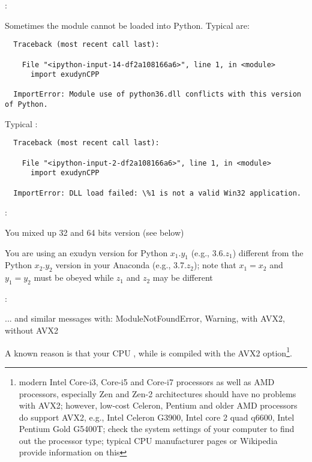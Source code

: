 \noindent {}:
\bi
  \item Sometimes the \codeName module cannot be loaded into Python. Typical  are: \vspace{1pt}\\
\plainlststyle
\begin{lstlisting}
  Traceback (most recent call last):

    File "<ipython-input-14-df2a108166a6>", line 1, in <module>
      import exudynCPP

  ImportError: Module use of python36.dll conflicts with this version of Python.
\end{lstlisting}
%
Typical :\vspace{1pt}\\
\begin{lstlisting}
  Traceback (most recent call last):
  
    File "<ipython-input-2-df2a108166a6>", line 1, in <module>
      import exudynCPP

  ImportError: DLL load failed: \%1 is not a valid Win32 application.
\end{lstlisting}
%
:
\bi
\item[$\ra$] You mixed up 32 and 64 bits version (see below) 
\item[$\ra$] You are using an exudyn version for Python $x_1.y_1$ (e.g., 3.6.$z_1$) different from the Python $x_2.y_2$ version in your Anaconda (e.g., 3.7.$z_2$); note that $x_1=x_2$ and $y_1=y_2$ must be obeyed while $z_1$ and $z_2$ may be different
\ei
%
\item {}:
\bi
\item[$\ra$] ... and similar messages with: ModuleNotFoundError, Warning, with AVX2, without AVX2
\item[$\ra$] A known reason is that your CPU , while \codeName is compiled with the AVX2 option\footnote{modern Intel Core-i3, Core-i5 and Core-i7 processors as well as AMD processors, especially Zen and Zen-2 architectures should have no problems with AVX2; however, low-cost Celeron, Pentium and older AMD processors do  support AVX2, e.g.,  Intel Celeron G3900, Intel core 2 quad q6600, Intel Pentium Gold G5400T; check the system settings of your computer to find out the processor type; typical CPU manufacturer pages or Wikipedia provide information on this}.
